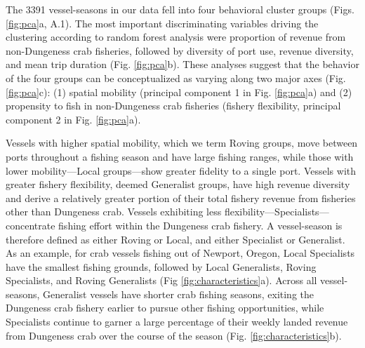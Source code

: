 \documentclass[]{elsarticle} %
\begin{document}
The 3391 vessel-seasons in our data fell into four behavioral cluster
groups (Figs. \ref{fig:pca}a, A.1). The most important discriminating
variables driving the clustering according to random forest analysis
were proportion of revenue from non-Dungeness crab fisheries, followed
by diversity of port use, revenue diversity, and mean trip duration
(Fig. \ref{fig:pca}b). These analyses suggest that the behavior of the
four groups can be conceptualized as varying along two major axes (Fig.
\ref{fig:pca}c): (1) spatial mobility (principal component 1 in Fig.
\ref{fig:pca}a) and (2) propensity to fish in non-Dungeness crab
fisheries (fishery flexibility, principal component 2 in Fig.
\ref{fig:pca}a).

Vessels with higher spatial mobility, which we term Roving groups, move
between ports throughout a fishing season and have large fishing ranges,
while those with lower mobility---Local groups---show greater fidelity
to a single port. Vessels with greater fishery flexibility, deemed
Generalist groups, have high revenue diversity and derive a relatively
greater portion of their total fishery revenue from fisheries other than
Dungeness crab. Vessels exhibiting less
flexibility---Specialists---concentrate fishing effort within the
Dungeness crab fishery. A vessel-season is therefore defined as either
Roving or Local, and either Specialist or Generalist. As an example, for
crab vessels fishing out of Newport, Oregon, Local Specialists have the
smallest fishing grounds, followed by Local Generalists, Roving
Specialists, and Roving Generalists (Fig \ref{fig:characteristics}a).
Across all vessel-seasons, Generalist vessels have shorter crab fishing
seasons, exiting the Dungeness crab fishery earlier to pursue other
fishing opportunities, while Specialists continue to garner a large
percentage of their weekly landed revenue from Dungeness crab over the
course of the season (Fig. \ref{fig:characteristics}b).
\end{document}
